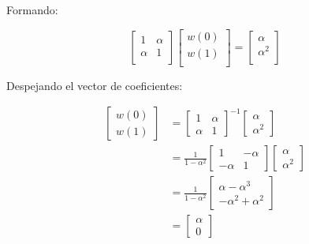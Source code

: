 \documentclass[a4paper]{article}
\begin{document}
Formando:

\begin{equation}
	\begin{bmatrix}
		1  &  \alpha \\
		 \alpha &  1 \\
	\end{bmatrix}
	\begin{bmatrix}
		w(0) \\
		w(1) \\
	\end{bmatrix}
	=
	\begin{bmatrix}
		\alpha \\
		\alpha^2 \\
	\end{bmatrix}
\end{equation}

Despejando el vector de coeficientes:

\begin{equation}
	\begin{aligned}
		\begin{bmatrix}
			w(0)\\
			w(1)
		\end{bmatrix}
		&=
		\begin{bmatrix}
			1 & \alpha\\
			\alpha & 1
		\end{bmatrix}^{-1}
		\begin{bmatrix}
			\alpha\\
			\alpha^2
		\end{bmatrix}\\[6pt]
		&=
		\frac{1}{1-\alpha^2}
		\begin{bmatrix}
			1 & -\alpha\\
			-\alpha & 1
		\end{bmatrix}
		\begin{bmatrix}
			\alpha\\
			\alpha^2
		\end{bmatrix}\\[6pt]
		&=
		\frac{1}{1-\alpha^2}
		\begin{bmatrix}
			\alpha-\alpha^3\\
			-\alpha^2+\alpha^2
		\end{bmatrix}\\[6pt]
		&=
		\begin{bmatrix}
			\alpha\\
			0
		\end{bmatrix}
	\end{aligned}
\end{equation}
\end{document}
